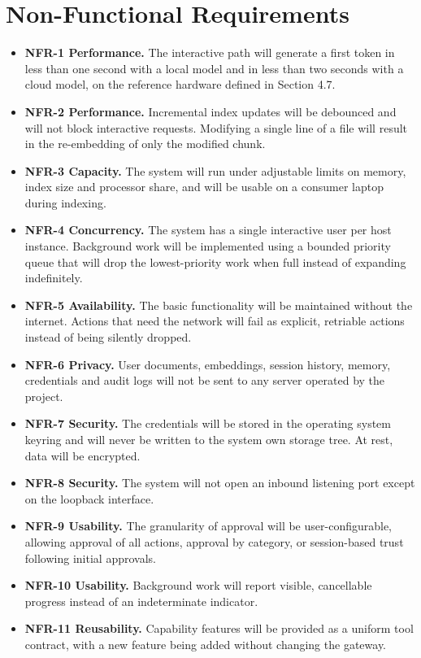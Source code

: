 \documentclass{FastFyp}
\begin{document}
\section{Non-Functional Requirements}
\begin{itemize}
    \item \textbf{NFR-1 Performance.} The interactive path will generate a first token in less than one second with a local model and in less than two seconds with a cloud model, on the reference hardware defined in Section 4.7.
    \item \textbf{NFR-2 Performance.} Incremental index updates will be debounced and will not block interactive requests. Modifying a single line of a file will result in the re-embedding of only the modified chunk.
    \item \textbf{NFR-3 Capacity.} The system will run under adjustable limits on memory, index size and processor share, and will be usable on a consumer laptop during indexing.
    \item \textbf{NFR-4 Concurrency.} The system has a single interactive user per host instance. Background work will be implemented using a bounded priority queue that will drop the lowest-priority work when full instead of expanding indefinitely.
    \item \textbf{NFR-5 Availability.} The basic functionality will be maintained without the internet. Actions that need the network will fail as explicit, retriable actions instead of being silently dropped.
    \item \textbf{NFR-6 Privacy.} User documents, embeddings, session history, memory, credentials and audit logs will not be sent to any server operated by the project.
    \item \textbf{NFR-7 Security.} The credentials will be stored in the operating system keyring and will never be written to the system own storage tree. At rest, data will be encrypted.
    \item \textbf{NFR-8 Security.} The system will not open an inbound listening port except on the loopback interface.
    \item \textbf{NFR-9 Usability.} The granularity of approval will be user-configurable, allowing approval of all actions, approval by category, or session-based trust following initial approvals.
    \item \textbf{NFR-10 Usability.} Background work will report visible, cancellable progress instead of an indeterminate indicator.
    \item \textbf{NFR-11 Reusability.} Capability features will be provided as a uniform tool contract, with a new feature being added without changing the gateway.

\end{itemize}
\end{document}
